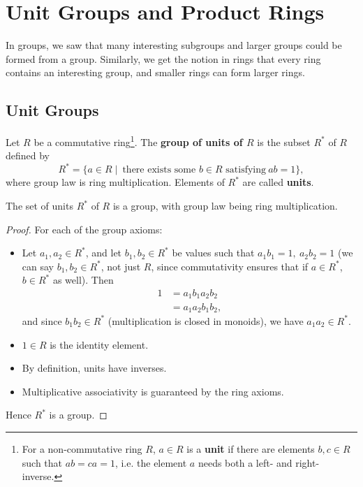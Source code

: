 \documentclass[math1530-lecture-notes]{subfiles}
\begin{document}
\section{Unit Groups and Product Rings}

In groups, we saw that many interesting subgroups and larger groups could be formed from a group.
Similarly, we get the notion in rings that every ring contains an interesting group, and smaller
rings can form larger rings.

\subsection{Unit Groups}

\begin{definition}{}
  Let $R$ be a commutative ring\footnote{For a non-commutative ring $R$, $a\in R$ is a
  \textbf{unit} if there are elements $b,c\in R$ such that $ab=ca=1$, i.e. the element $a$ needs
both a left- and right-inverse.}. The \textbf{group of units of $R$} is the subset $R^*$ of $R$
defined by \[
  R^* = \{a\in R\mid ~\text{there exists some $b\in R$ satisfying}~ ab=1\} 
,\] where group law is ring multiplication. Elements of $R^*$ are called \textbf{units}.
\end{definition}

\begin{proposition}[]{}
  The set of units $R^*$ of $R$ is a group, with group law being ring multiplication.
\end{proposition}
\begin{proof}[Proof]
  For each of the group axioms:
  \begin{itemize}
    \item Let $a_1,a_2\in R^*$, and let $b_1,b_2\in R^*$ be values such that $a_1b_1=1,\ a_2b_2=1$
      (we can say $b_1,b_2\in R^*$, not just $R$, since commutativity ensures that if $a\in R^*$,
      $b\in R^*$ as well). Then
      \begin{align*}
        1 &= a_1b_1a_2b_2 \\
        &= a_1a_2b_1b_2
      ,\end{align*} and since $b_1b_2\in R^*$ (multiplication is closed in monoids), we have $
      a_1a_2\in R^*$.
    \item $1\in R$ is the identity element.
    \item By definition, units have inverses.
    \item Multiplicative associativity is guaranteed by the ring axioms.
  \end{itemize}
  Hence $R^*$ is a group.
\end{proof}
\end{document}
